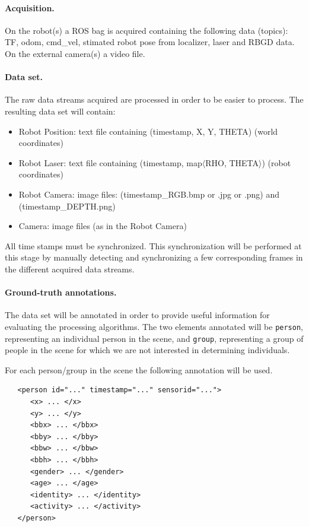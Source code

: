 \documentclass{article}
\begin{document}
\paragraph{Acquisition.} On the robot(s) a ROS bag is acquired containing the following data (topics): 
TF, odom, cmd\_vel, stimated robot pose from localizer, laser and RBGD data. On the external camera(s) a video file. 

\paragraph{Data set.} The raw data streams acquired are processed in order to be easier to process. The resulting data set will contain:
\begin{itemize}
\item Robot Position: text file containing (timestamp, X, Y, THETA) (world coordinates)
\item Robot Laser: text file containing (timestamp, map$\langle$RHO, THETA$\rangle$)  (robot coordinates)
\item Robot Camera: image files:	(timestamp\_RGB.bmp or .jpg or .png) and
 				(timestamp\_DEPTH.png)
\item Camera: image files (as in the Robot Camera)
\end{itemize}

All time stamps must be synchronized. This synchronization will be performed at this stage by manually detecting and synchronizing a few corresponding frames in the different acquired data streams.

\paragraph{Ground-truth annotations.} The data set will be annotated in order to provide useful information for evaluating the processing algorithms.
The two elements annotated will be {\tt person}, representing an individual person in the scene, and {\tt group}, representing a group of people in the scene for which we are not interested in determining individuals.

For each person/group in the scene the following annotation will be used.

\begin{verbatim}
   <person id="..." timestamp="..." sensorid="...">
      <x> ... </x>
      <y> ... </y>
      <bbx> ... </bbx>
      <bby> ... </bby>
      <bbw> ... </bbw>
      <bbh> ... </bbh>
      <gender> ... </gender>
      <age> ... </age>
      <identity> ... </identity>
      <activity> ... </activity>
   </person> 
\end{verbatim}
\end{document}
